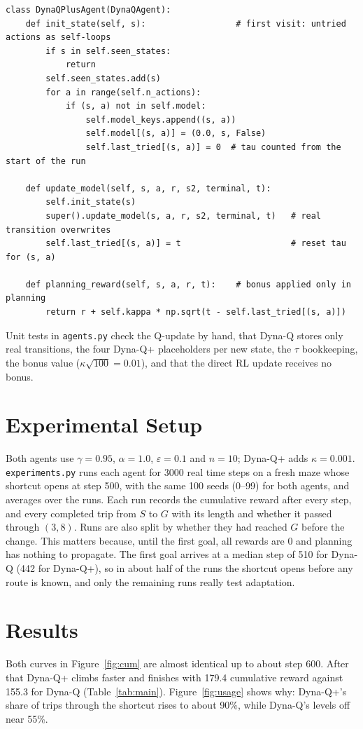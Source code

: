 \documentclass[11pt]{article}
\begin{document}
\begin{lstlisting}
class DynaQPlusAgent(DynaQAgent):
    def init_state(self, s):                  # first visit: untried actions as self-loops
        if s in self.seen_states:
            return
        self.seen_states.add(s)
        for a in range(self.n_actions):
            if (s, a) not in self.model:
                self.model_keys.append((s, a))
                self.model[(s, a)] = (0.0, s, False)
                self.last_tried[(s, a)] = 0  # tau counted from the start of the run

    def update_model(self, s, a, r, s2, terminal, t):
        self.init_state(s)
        super().update_model(s, a, r, s2, terminal, t)   # real transition overwrites
        self.last_tried[(s, a)] = t                      # reset tau for (s, a)

    def planning_reward(self, s, a, r, t):    # bonus applied only in planning
        return r + self.kappa * np.sqrt(t - self.last_tried[(s, a)])
\end{lstlisting}

\noindent Unit tests in \texttt{agents.py} check the Q-update by hand, that Dyna-Q stores only
real transitions, the four Dyna-Q+ placeholders per new state, the $\tau$ bookkeeping, the bonus
value ($\kappa\sqrt{100} = 0.01$), and that the direct RL update receives no bonus.

\section{Experimental Setup}
Both agents use $\gamma = 0.95$, $\alpha = 1.0$, $\varepsilon = 0.1$ and $n = 10$; Dyna-Q+ adds
$\kappa = 0.001$. \texttt{experiments.py} runs each agent for 3000 real time steps on a fresh
maze whose shortcut opens at step 500, with the same 100 seeds (0--99) for both agents, and
averages over the runs. Each run records the cumulative reward after every step, and every
completed trip from $S$ to $G$ with its length and whether it passed through $(3,8)$. Runs are
also split by whether they had reached $G$ before the change. This matters because, until the
first goal, all rewards are 0 and planning has nothing to propagate. The first goal arrives at a
median step of 510 for Dyna-Q (442 for Dyna-Q+), so in about half of the runs the shortcut opens
before any route is known, and only the remaining runs really test adaptation.

\section{Results}
Both curves in Figure~\ref{fig:cum} are almost identical up to about step 600. After that
Dyna-Q+ climbs faster and finishes with 179.4 cumulative reward against 155.3 for Dyna-Q
(Table~\ref{tab:main}). Figure~\ref{fig:usage} shows why: Dyna-Q+'s share of trips through the
shortcut rises to about 90\%, while Dyna-Q's levels off near 55\%.
\end{document}
